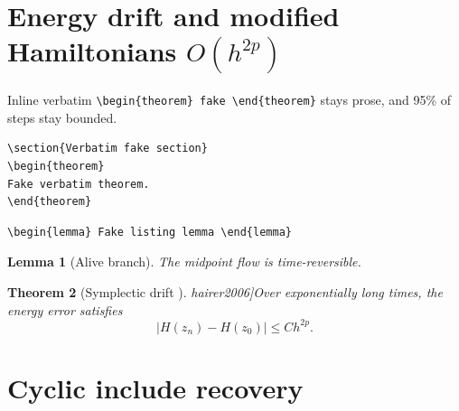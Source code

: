 \documentclass{article}
\newtheorem{theorem}{Theorem}[section]
\newtheorem{lemma}[theorem]{Lemma}
\begin{document}
\section{Energy drift %
  and modified Hamiltonians $O(h^{2p})$}\label{sec:drift}
Inline verbatim \verb|\begin{theorem} fake \end{theorem}| stays prose, and 95\% of steps stay bounded. %
\begin{verbatim}
\section{Verbatim fake section}
\begin{theorem}
Fake verbatim theorem.
\end{theorem}
\end{verbatim}
\begin{lstlisting}
\begin{lemma} Fake listing lemma \end{lemma}
\end{lstlisting}
\iffalse
\iftrue
Nested conditional with $A \iff B$.
\fi
\begin{theorem}
Dead theorem inside iffalse.
\end{theorem}
\fi
\iffalse
Dead branch before else.
\else
\begin{lemma}[Alive branch]\label{lem:alive}
The midpoint flow is time-reversible.
\end{lemma}
\fi
\begin{theorem}[Symplectic drift \cite[Theorem 3.2]{hairer2006}]\label{thm:drift}
Over exponentially long times, the energy error satisfies
\begin{equation}\label{eq:modified}\tag{S1}
|H(z_n) - H(z_0)| \le C h^{2p}.
\end{equation}
\end{theorem}
\section{Cyclic include recovery}\label{sec:cycle}

\end{document}
